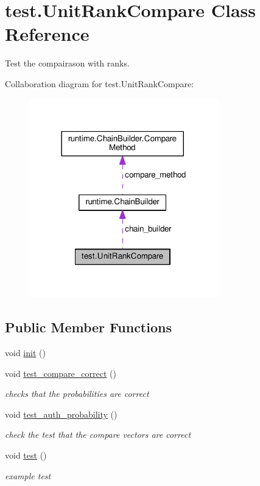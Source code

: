 \hypertarget{classtest_1_1_unit_rank_compare}{}\section{test.\+Unit\+Rank\+Compare Class Reference}
\label{classtest_1_1_unit_rank_compare}


Test the compairason with ranks.  




Collaboration diagram for test.\+Unit\+Rank\+Compare\+:
\nopagebreak
\begin{figure}[H]
\begin{center}
\leavevmode
\includegraphics[width=234pt]{classtest_1_1_unit_rank_compare__coll__graph}
\end{center}
\end{figure}
\subsection*{Public Member Functions}
\begin{DoxyCompactItemize}
\item 
void \hyperlink{classtest_1_1_unit_rank_compare_ae0b3fb1356fcac8e9cf4d9bf7f4f323a}{init} ()
\item 
void \hyperlink{classtest_1_1_unit_rank_compare_ac8fdeb295d6451a69577d1ebe8ce458c}{test\+\_\+compare\+\_\+correct} ()
\begin{DoxyCompactList}\small\item\em checks that the probabilities are correct \end{DoxyCompactList}\item 
void \hyperlink{classtest_1_1_unit_rank_compare_ae488cafc0902af68a01e2d670350ccee}{test\+\_\+auth\+\_\+probability} ()
\begin{DoxyCompactList}\small\item\em check the test that the compare vectors are correct \end{DoxyCompactList}\item 
void \hyperlink{classtest_1_1_unit_rank_compare_aa02abba5193ffdbbb3fa8ed9d0cbcfe6}{test} ()
\begin{DoxyCompactList}\small\item\em example test \end{DoxyCompactList}\end{DoxyCompactItemize}


